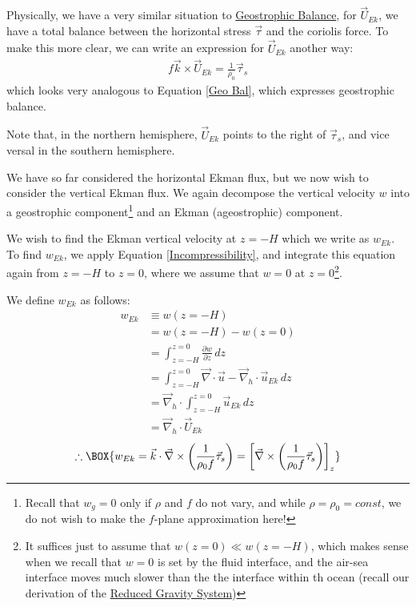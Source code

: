 Physically, we have a very similar situation to \hyperref[Geostrophic Box]{Geostrophic Balance}, for $\vec{U}_{Ek}$, we have a total balance between the horizontal stress $\vec{\tau}$ and the coriolis force. To make this more clear, we can write an expression for $\vec{U}_{Ek}$ another way:
\begin{align*}
    f\vec{k}\times \vec{U}_{Ek} = \frac{1}{\rho_0}\vec{\tau}_s
\end{align*}
which looks very analogous to Equation \ref{Geo Bal}, which expresses geostrophic balance.

Note that, in the northern hemisphere, $\vec{U}_{Ek}$ points to the right of $\vec{\tau}_s$, and vice versal in the southern hemisphere.

We have so far considered the horizontal Ekman flux, but we now wish to consider the vertical Ekman flux. We again decompose the vertical velocity $w$ into a geostrophic component\footnote{Recall that $w_g=0$ only if $\rho$ and $f$ do not vary, and while $\rho=\rho_0=const$, we do not wish to make the $f$-plane approximation here!} and an Ekman (ageostrophic) component. 

We wish to find the Ekman vertical velocity at $z=-H$ which we write as $w_{Ek}$. To find $w_{Ek}$, we apply Equation \ref{Incompressibility}, and integrate this equation again from $z=-H$ to $z=0$, where we assume that $w=0$ at $z=0$\footnote{It suffices just to assume that $w(z=0)\ll w(z=-H)$, which makes sense when we recall that $w=0$ is set by the fluid interface, and the air-sea interface moves much slower than the the interface within th ocean (recall our derivation of the \hyperref[RG Box]{Reduced Gravity System})}.

We define $w_{Ek}$ as follows:
\begin{align*}
    w_{Ek}&\equiv
    w(z=-H)
    \\
    &= w(z=-H)-w(z=0)
    \\
    &=\int_{z=-H}^{z=0}\frac{\partial w}{\partial z}\,dz
    \\
    &=\int_{z=-H}^{z=0}\vec{\nabla}\cdot\vec{u} - \vec{\nabla}_h \cdot \vec{u}_{Ek}\,dz
    \\
    &=\vec{\nabla}_h \cdot\int_{z=-H}^{z=0}\vec{u}_{Ek}\,dz
    \\
    &=\vec{\nabla}_h \cdot \vec{U}_{Ek}
\end{align*}
\begin{gather}
    \therefore \BOX{
        w_{Ek}=\vec{k}\cdot \vec{\nabla} \times \left( \frac{1}{\rho_0 f}\vec{\tau}_s \right) = \left[
            \vec{\nabla} \times \left( \frac{1}{\rho_0 f}\vec{\tau}_s \right)
        \right]_z
    }
\end{gather}

